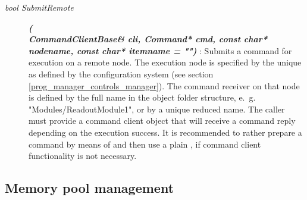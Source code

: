 \begin{description}
\item[\em bool SubmitRemote] {\small \bf\em (} \\
{\small \bf\em CommandClientBase\& cli, Command* cmd, const char* nodename, const char* itemname = "") }:
Submits a command  for execution on a remote node. 
The execution node is specified by the unique  as defined
by the configuration system (see section \ref{prog_manager_controls_manager}).
The command receiver on that node
is defined by the full name  in the object folder structure,
e.~g.~ "Modules/ReadoutModule1", or by a unique reduced name. 
The caller must provide a command client object
 that will receive a command reply depending on the execution success.
It is recommended to rather prepare a command by means of  
and then use a  plain , if command client functionality
is not necessary.


\end{description}
 
\subsection{Memory pool management}	 	   

